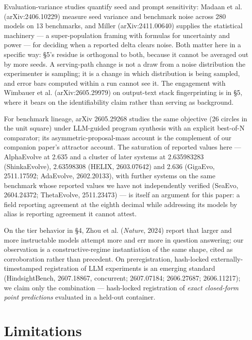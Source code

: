 \documentclass[11pt]{article}
\begin{document}
Evaluation-variance studies quantify seed and prompt sensitivity: Madaan et al.
(arXiv:2406.10229) measure seed variance and benchmark noise across 280 models on 13
benchmarks, and Miller (arXiv:2411.00640) supplies the statistical machinery --- a
super-population framing with formulas for uncertainty and power --- for deciding when a
reported delta clears noise. Both matter here in a specific way: \S5's residue is
orthogonal to both, because it cannot be averaged out by more seeds. A serving-path change
is not a draw from a noise distribution the experimenter is sampling; it is a change in
which distribution is being sampled, and error bars computed within a run cannot see it.
The engagement with Wimbauer et al. (arXiv:2605.29979) on output-text stack fingerprinting
is in \S5, where it bears on the identifiability claim rather than serving as background.

For benchmark lineage, arXiv 2605.29268 studies the same objective (26 circles in the
unit square) under LLM-guided program synthesis with an explicit best-of-N comparator;
its asymmetric-proposal-mass account is the complement of our companion paper's
attractor account. The saturation of reported values here --- AlphaEvolve at 2.635 and a
cluster of later systems at 2.635983283 (ShinkaEvolve), 2.63598308 (HELIX,
2603.07642) and 2.636 (GigaEvo, 2511.17592; AdaEvolve, 2602.20133), with further
systems on the same benchmark whose reported values we have not independently
verified (SeaEvo, 2604.24372; ThetaEvolve, 2511.23473) --- is itself an argument for
this paper: a field reporting agreement at the eighth decimal while addressing its
models by alias is reporting agreement it cannot attest.

On the tier behavior in \S4, Zhou et al. (\emph{Nature}, 2024) report that larger and more
instructable models attempt more and err more in question answering; our observation
is a constructive-regime instantiation of the same shape, cited as corroboration
rather than precedent. On preregistration, hash-locked externally-timestamped
registration of LLM experiments is an emerging standard (HindsightBench, 2607.18867,
concurrent; 2607.07184; 2606.27687; 2606.11217); we claim only the combination ---
hash-locked registration of \emph{exact closed-form point predictions} evaluated in a
held-out container.

\section{Limitations}
\end{document}
